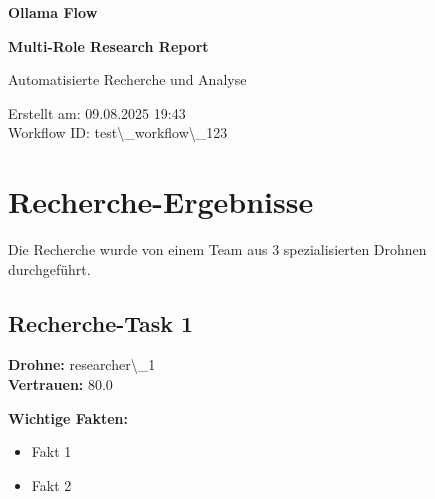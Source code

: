 \documentclass[12pt,a4paper]{article}
\begin{document}
\begin{titlepage}
    \centering
    
    \vspace*{2cm}
    
    {\Huge\bfseries Ollama Flow}
    
    {\Huge\bfseries Multi-Role Research Report}
    
    \vspace{2cm}
    
    {\Large Automatisierte Recherche und Analyse}
    
    \vspace{3cm}
    
    
    \vspace{2cm}
    
    
    \vfill
    
    {\large
    Erstellt am: 09.08.2025 19:43\\
    Workflow ID: test\textbackslash{}_workflow\textbackslash{}_123
    }
    
\end{titlepage}

\newpage
\tableofcontents
\newpage

\section{Recherche-Ergebnisse}

Die Recherche wurde von einem Team aus 3 spezialisierten Drohnen durchgeführt.

\subsection{Recherche-Task 1}

\textbf{Drohne:} researcher\textbackslash{}_1\\
\textbf{Vertrauen:} 80.0%

\textbf{Wichtige Fakten:}
\begin{itemize}
\item Fakt 1
\item Fakt 2
\end{itemize}
\end{document}
